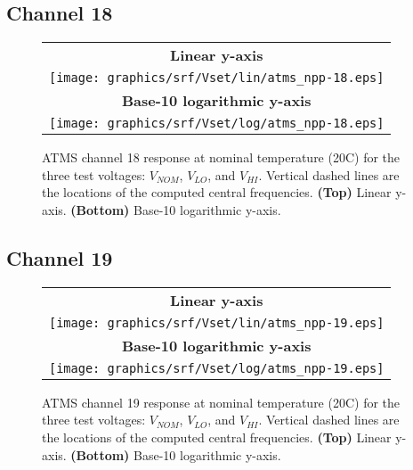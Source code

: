 \subsection{Channel 18}
\begin{figure}[H]
  \label{fig:Vset.ch18_response}
  \centering
  \begin{tabular}{c}
    \hspace{0.75cm}\sffamily\textbf{Linear y-axis} \\
    \texttt{[image: graphics/srf/Vset/lin/atms\_npp-18.eps]} \\
    \hspace{0.75cm}\sffamily\textbf{Base-10 logarithmic y-axis} \\
    \texttt{[image: graphics/srf/Vset/log/atms\_npp-18.eps]}
  \end{tabular}
  \caption{ATMS channel 18 response at nominal temperature (20\textdegree{}C) for the three test voltages: $V_{NOM}$, $V_{LO}$, and $V_{HI}$. Vertical dashed lines are the locations of the computed central frequencies. \textbf{(Top)} Linear y-axis. \textbf{(Bottom)} Base-10 logarithmic y-axis.}
\end{figure}

\subsection{Channel 19}
\begin{figure}[H]
  \label{fig:Vset.ch19_response}
  \centering
  \begin{tabular}{c}
    \hspace{0.75cm}\sffamily\textbf{Linear y-axis} \\
    \texttt{[image: graphics/srf/Vset/lin/atms\_npp-19.eps]} \\
    \hspace{0.75cm}\sffamily\textbf{Base-10 logarithmic y-axis} \\
    \texttt{[image: graphics/srf/Vset/log/atms\_npp-19.eps]}
  \end{tabular}
  \caption{ATMS channel 19 response at nominal temperature (20\textdegree{}C) for the three test voltages: $V_{NOM}$, $V_{LO}$, and $V_{HI}$. Vertical dashed lines are the locations of the computed central frequencies. \textbf{(Top)} Linear y-axis. \textbf{(Bottom)} Base-10 logarithmic y-axis.}
\end{figure}


